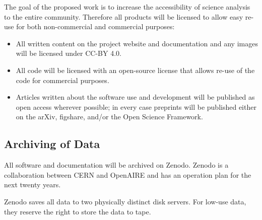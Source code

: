 \documentclass[11pt]{article}
\begin{document}
The goal of the proposed work is to increase the accessibility of science analysis to the entire community.  Therefore all products will be licensed to allow easy re-use for both non-commercial and commercial purposes:

\begin{itemize}
  \item All written content on the project website and documentation and any images will be licensed under CC-BY 4.0. 
  \item All code will be licensed with an open-source license that allows re-use of the code for commercial purposes.  
  \item Articles written about the software use and development will be published as open access wherever possible; in every case preprints will be published either on the arXiv, figshare, and/or the Open Science Framework.
\end{itemize}



\subsection{Archiving of Data}
All software and documentation will be archived on Zenodo.  Zenodo is a collaboration between CERN and OpenAIRE and has an operation plan for the next twenty years.

Zenodo saves all data to two physically distinct disk servers.  For low-use data, they reserve the right to store the data to tape.

\end{document}
